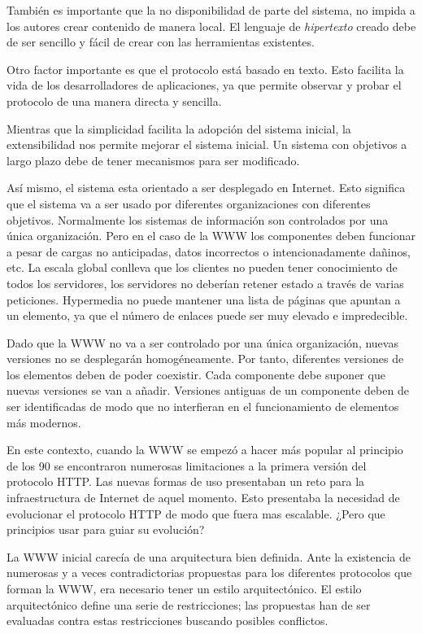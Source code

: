 También es importante que la no disponibilidad de parte del sistema,
no impida a los autores crear contenido de manera local. El lenguaje
de \emph{hipertexto} creado debe de ser sencillo y fácil de crear con
las herramientas existentes.

Otro factor importante es que el protocolo está basado en texto. Esto
facilita la vida de los desarrolladores de aplicaciones, ya que
permite observar y probar el protocolo de una manera directa y
sencilla.

Mientras que la simplicidad facilita la adopción del sistema inicial,
la extensibilidad nos permite mejorar el sistema inicial. Un sistema
con objetivos a largo plazo debe de tener mecanismos para ser
modificado.

Así mismo, el sistema esta orientado a ser desplegado en
Internet. Esto significa que el sistema va a ser usado por diferentes
organizaciones con diferentes objetivos. Normalmente los sistemas de
información son controlados por una única organización. Pero en el
caso de la WWW los componentes deben funcionar a pesar de cargas no
anticipadas, datos incorrectos o intencionadamente dañinos, etc. La
escala global conlleva que los clientes no pueden tener conocimiento
de todos los servidores, los servidores no deberían retener estado a
través de varias peticiones. Hypermedia no puede mantener una lista de
páginas que apuntan a un elemento, ya que el número de enlaces puede
ser muy elevado e impredecible.

Dado que la WWW no va a ser controlado por una única organización,
nuevas versiones no se desplegarán homogéneamente. Por tanto,
diferentes versiones de los elementos deben de poder coexistir. Cada
componente debe suponer que nuevas versiones se van a añadir.
Versiones antiguas de un componente deben de ser identificadas de modo
que no interfieran en el funcionamiento de elementos más modernos.

En este contexto, cuando la WWW se empezó a hacer más popular al
principio de los 90 se encontraron numerosas limitaciones a la primera
versión del protocolo HTTP. Las nuevas formas de uso presentaban un
reto para la infraestructura de Internet de aquel momento. Esto
presentaba la necesidad de evolucionar el protocolo HTTP de modo que
fuera mas escalable. ¿Pero que principios usar para guiar su evolución?

La WWW inicial carecía de una arquitectura bien definida. Ante la
existencia de numerosas y a veces contradictorias propuestas para los
diferentes protocolos que forman la WWW, era necesario tener un estilo
arquitectónico. El estilo arquitectónico define una serie de
restricciones; las propuestas han de ser evaluadas contra estas
restricciones buscando posibles conflictos.

